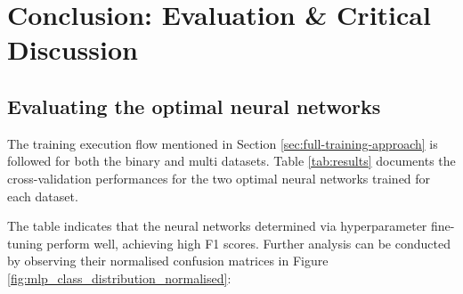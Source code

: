 \documentclass[letterpaper,12pt]{article}
\begin{document}

\section{Conclusion: Evaluation \& Critical Discussion}
\label{sec:evaluation}

\subsection{Evaluating the optimal neural networks}

The training execution flow mentioned in Section \ref{sec:full-training-approach} is followed for both the binary and multi datasets. Table \ref{tab:results} documents the cross-validation performances for the two optimal neural networks trained for each dataset.



The table indicates that the neural networks determined via hyperparameter fine-tuning perform well, achieving high F1 scores. Further analysis can be conducted by observing their normalised confusion matrices in Figure \ref{fig:mlp_class_distribution_normalised}:
\end{document}
